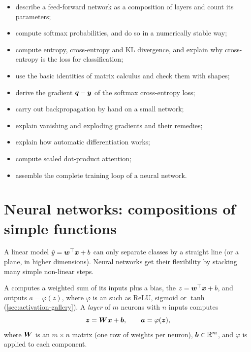 \begin{objectives}
\begin{itemize}
  \item describe a feed-forward network as a composition of layers and count its
    parameters;
  \item compute softmax probabilities, and do so in a numerically stable way;
  \item compute entropy, cross-entropy and KL divergence, and explain why
    cross-entropy is the loss for classification;
  \item use the basic identities of matrix calculus and check them with shapes;
  \item derive the gradient $\bm{q} - \bm{y}$ of the softmax cross-entropy loss;
  \item carry out backpropagation by hand on a small network;
  \item explain vanishing and exploding gradients and their remedies;
  \item explain how automatic differentiation works;
  \item compute scaled dot-product attention;
  \item assemble the complete training loop of a neural network.
\end{itemize}
\end{objectives}

\section{Neural networks: compositions of simple functions}\label{sec:neural-networks}

A linear model $\hat y = \bm{w}^\top\bm{x} + b$ can only separate classes by a straight
line (or a plane, in higher dimensions). Neural networks get their flexibility
by stacking many simple non-linear steps.

\begin{definition}\label{def:layer}
A  computes a weighted sum of its inputs plus a bias, the
 $z = \bm{w}^\top\bm{x} + b$, and outputs $a = \varphi(z)$, where
$\varphi$ is an  such as ReLU, sigmoid or $\tanh$
(\cref{sec:activation-gallery}). A \emph{layer} of $m$ neurons with $n$ inputs
computes
\[
  \bm{z} = \bm{W}\bm{x} + \bm{b}, \qquad \bm{a} = \varphi(\bm{z}),
\]
where $\bm{W}$ is an $m\times n$ matrix (one row of weights per neuron),
$\bm{b} \in \mathbb{R}^m$, and $\varphi$ is applied to each component.
\end{definition}

